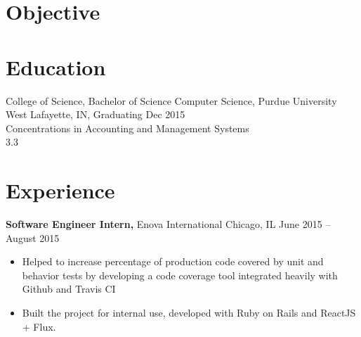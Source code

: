 \documentclass[margin]{res}
\begin{document}
 
 
 
 \address{Carmel, IN 46033, \\ 317-372-0622}

 
\begin{resume} 
 
\section{Objective} 


\section{Education}


College of Science, Bachelor of Science Computer Science, Purdue University West Lafayette, IN, Graduating Dec 2015 \\
Concentrations in Accounting and Management Systems \\
3.3
 


\section{Experience}


 {\bf Software Engineer Intern,} Enova International Chicago, IL \hfill June 2015 -- August 2015
 \begin{itemize} \itemsep -2pt  %
 
   \item Helped to increase percentage of production code covered by unit and behavior tests by developing a code coverage tool integrated heavily with Github and Travis CI
 
   \item Built the project for internal use, developed with Ruby on Rails and ReactJS + Flux.
 
 \end{itemize}



\end{resume}
\end{document}
